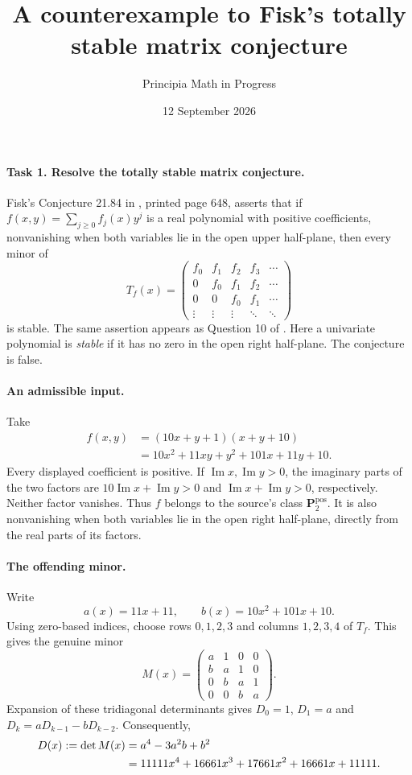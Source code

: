 \documentclass[11pt]{article}
\title{A counterexample to Fisk's totally stable matrix conjecture}
\author{Principia Math in Progress}
\date{12 September 2026}
\begin{document}
\maketitle

\paragraph{Task 1. Resolve the totally stable matrix conjecture.}
Fisk's Conjecture 21.84 in \cite{book}, printed page 648, asserts that
if \(f(x,y)=\sum_{j\ge0}f_j(x)y^j\) is a real polynomial with positive
coefficients, nonvanishing when both variables lie in the open upper
half-plane, then every minor of
\[
 T_f(x)=
 \begin{pmatrix}
 f_0&f_1&f_2&f_3&\cdots\\
 0&f_0&f_1&f_2&\cdots\\
 0&0&f_0&f_1&\cdots\\
 \vdots&\vdots&\vdots&\ddots&\ddots
 \end{pmatrix}
\]
is stable. The same assertion appears as Question 10 of \cite{questions}.
Here a univariate polynomial is \emph{stable} if it has no zero in the
open right half-plane. The conjecture is false.

\paragraph{An admissible input.}
Take
\begin{align*}
 f(x,y)&=(10x+y+1)(x+y+10)\\
       &=10x^2+11xy+y^2+101x+11y+10.
\end{align*}
Every displayed coefficient is positive. If
\(\operatorname{Im}x,\operatorname{Im}y>0\), the imaginary parts of the
two factors are \(10\operatorname{Im}x+\operatorname{Im}y>0\) and
\(\operatorname{Im}x+\operatorname{Im}y>0\), respectively.
Neither factor vanishes. Thus \(f\) belongs to the source's class
\(\mathbf P^{\mathrm{pos}}_2\).
It is also nonvanishing when both variables lie in the open right
half-plane, directly from the real parts of its factors.

\paragraph{The offending minor.}
Write
\[
 a(x)=11x+11,\qquad b(x)=10x^2+101x+10.
\]
Using zero-based indices, choose rows \(0,1,2,3\) and columns \(1,2,3,4\)
of \(T_f\). This gives the genuine minor
\[
 M(x)=
 \begin{pmatrix}
 a&1&0&0\\
 b&a&1&0\\
 0&b&a&1\\
 0&0&b&a
 \end{pmatrix}.
\]
Expansion of these tridiagonal determinants gives \(D_0=1\), \(D_1=a\)
and \(D_k=aD_{k-1}-bD_{k-2}\). Consequently,
\begin{align}
 D(x):=\det M(x)
 &=a^4-3a^2b+b^2 \notag\\
 &=11111x^4+16661x^3+17661x^2+16661x+11111. \label{eq:D}
\end{align}
\end{document}
